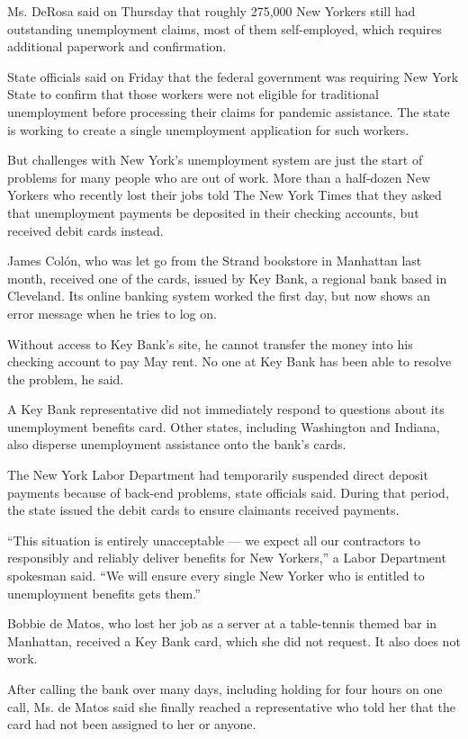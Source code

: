 Ms. DeRosa said on Thursday that roughly 275,000 New Yorkers still had
outstanding unemployment claims, most of them self-employed, which
requires additional paperwork and confirmation.

State officials said on Friday that the federal government was requiring
New York State to confirm that those workers were not eligible for
traditional unemployment before processing their claims for pandemic
assistance. The state is working to create a single unemployment
application for such workers.

But challenges with New York's unemployment system are just the start of
problems for many people who are out of work. More than a half-dozen New
Yorkers who recently lost their jobs told The New York Times that they
asked that unemployment payments be deposited in their checking
accounts, but received debit cards instead.

James Colón, who was let go from the Strand bookstore in Manhattan last
month, received one of the cards, issued by Key Bank, a regional bank
based in Cleveland. Its online banking system worked the first day, but
now shows an error message when he tries to log on.

Without access to Key Bank's site, he cannot transfer the money into his
checking account to pay May rent. No one at Key Bank has been able to
resolve the problem, he said.

A Key Bank representative did not immediately respond to questions about
its unemployment benefits card. Other states, including Washington and
Indiana, also disperse unemployment assistance onto the bank's cards.

The New York Labor Department had temporarily suspended direct deposit
payments because of back-end problems, state officials said. During that
period, the state issued the debit cards to ensure claimants received
payments.

``This situation is entirely unacceptable --- we expect all our
contractors to responsibly and reliably deliver benefits for New
Yorkers,'' a Labor Department spokesman said. ``We will ensure every
single New Yorker who is entitled to unemployment benefits gets them.''

Bobbie de Matos, who lost her job as a server at a table-tennis themed
bar in Manhattan, received a Key Bank card, which she did not request.
It also does not work.

After calling the bank over many days, including holding for four hours
on one call, Ms. de Matos said she finally reached a representative who
told her that the card had not been assigned to her or anyone.

